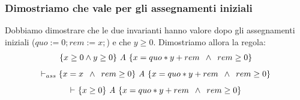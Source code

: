 \begin{esempio}
				      					\subsubsection{Dimostriamo che vale per gli assegnamenti iniziali}
				      					Dobbiamo dimostrare che le due invarianti hanno valore dopo gli assegnamenti iniziali ($quo := 0; rem := x;$) e che $y\geq0$. 
				      					Dimostriamo allora la regola:
				      					\begin{align}
				      						\{x\geq 0 \land y\geq 0\}\mbox{ \textit{A} }\{x=quo*y + rem\,\,\,\land\,\,\, rem \geq 0\} 
				      						\label{ToCheck2}                                                                         
				      					\end{align}
				      					\[\vdash_{ass}\{x=x\,\,\,\land\,\,\, rem \geq 0\}\mbox{ \textit{A} }\{x=quo*y + rem\,\,\,\land\,\,\, rem \geq 0\}\]
				      					\[\vdash_{}\{x \geq 0\}\mbox{ \textit{A} }\{x=quo*y + rem\,\,\,\land\,\,\, rem \geq 0\}\]
				      				\end{esempio}
